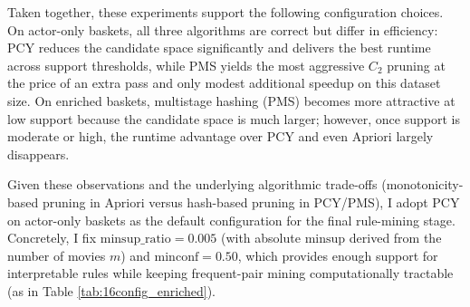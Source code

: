 \documentclass{article}  %
\begin{document}
\FloatBarrier
Taken together, these experiments support the following configuration choices. On actor-only baskets, all three algorithms are correct but differ in efficiency: PCY reduces the candidate space significantly and delivers the best runtime across support thresholds, while PMS yields the most aggressive \(C_{2}\) pruning at the price of an extra pass and only modest additional speedup on this dataset size. On enriched baskets, multistage hashing (PMS) becomes more attractive at low support because the candidate space is much larger; however, once support is moderate or high, the runtime advantage over PCY and even Apriori largely disappears.

Given these observations and the underlying algorithmic trade-offs (monotonicity-based pruning in Apriori versus hash-based pruning in PCY/PMS),
I adopt PCY on actor-only baskets as the default configuration for the final rule-mining stage. Concretely, I fix \(\mathrm{minsup\_ratio} = 0.005\) (with absolute \(\mathrm{minsup}\) derived from the number of movies \(m\)) and \(\mathrm{minconf} = 0.50\), which provides enough support for interpretable rules while keeping frequent-pair mining computationally tractable (as in Table \ref{tab:16config_enriched}).
\end{document}
